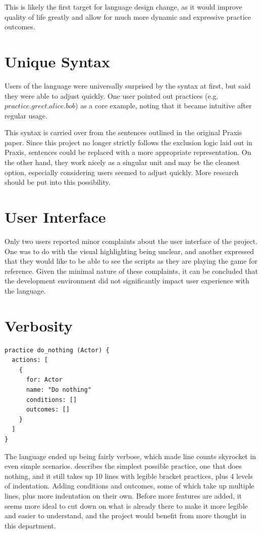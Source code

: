 This is likely the first target for language design change, as it would improve quality
of life greatly and allow for much more dynamic and expressive practice outcomes.

\section{Unique Syntax} \label{sec:UniqueSyntax}

Users of the language were universally surprised by the syntax at first, but said they
were able to adjust quickly. One user pointed out practices (e.g. $practice.greet.alice.bob$)
as a core example, noting that it became intuitive after regular usage.

This syntax is carried over from the sentences outlined in the original Praxis paper. \cite{evans_ai_2015}
Since this project no longer strictly follows the exclusion logic laid out in
Praxis, sentences could be replaced with a more appropriate representation. On the other
hand, they work nicely as a singular unit and may be the cleanest option, especially
considering users seemed to adjust quickly. More research should be put into this
possibility.

\section{User Interface} \label{sec:UserInterface}

Only two users reported minor complaints about the user interface of the project.
One was to do with the visual highlighting being unclear, and another expressed that
they would like to be able to see the scripts as they are playing the game for
reference. Given the minimal nature of these complaints, it can be concluded that
the development environment did not significantly impact user experience with the language.

\section{Verbosity} \label{sec:Verbosity}

\begin{lstlisting}[float=hb, caption=A simple Do Nothing practice., label=lst:DoNothingPractice]
practice do_nothing (Actor) {
  actions: [
    {
      for: Actor
      name: "Do nothing"
      conditions: []
      outcomes: []
    }
  ]
}
\end{lstlisting}

The language ended up being fairly verbose, which made line counts skyrocket in even
simple scenarios.  describes the simplest possible practice,
one that does nothing, and it still takes up 10 lines with legible bracket practices,
plus 4 levels of indentation. Adding conditions and outcomes, some of which take up
multiple lines, plus more indentation on their own. Before more features are added,
it seems more ideal to cut down on what is already there to make it more legible and
easier to understand, and the project would benefit from more thought in this
department.


